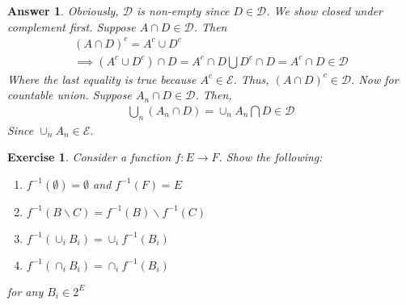 \documentclass[12pt]{article}
\theoremstyle{colon}
\newtheorem{exercise}{Exercise}
\newtheorem*{answer}{Answer}
\begin{document}
\begin{answer}
  Obviously, $\mathcal{D}$ is non-empty since $D \in \mathcal{D}$. We show closed under complement first. Suppose $A \cap D \in \mathcal{D}$. Then
  \begin{gather*}
    (A \cap D)^c = A^c \cup D^c \\
    \implies (A^c \cup D^c) \cap D = A^c \cap D \bigcup D^c \cap D = A^c \cap D \in \mathcal{D}
  \end{gather*}
  Where the last equality is true because $A^c \in \mathcal{E}$.
  Thus, $(A \cap D)^c \in \mathcal{D}$. Now for countable union. Suppose $A_n \cap D \in \mathcal{D}$. Then,
  \begin{gather*}
    \bigcup_n (A_n \cap D) = \cup_n A_n \bigcap D \in \mathcal{D}
  \end{gather*}
  Since $\cup_n A_n \in \mathcal{E}$.
\end{answer}

\clearpage

\begin{exercise}
  Consider a function $f: E \rightarrow F$. Show the following:
  \begin{enumerate}[label=\roman*)]
    \item $f^{-1}(\emptyset) = \emptyset$ and $f^{-1}(F) = E$
    \item $f^{-1}(B \backslash C) = f^{-1}(B) \backslash f^{-1}(C)$
    \item $f^{-1}(\cup_i B_i) = \cup_i f^{-1}(B_i)$
    \item $f^{-1}(\cap_i B_i) = \cap_i f^{-1}(B_i)$
  \end{enumerate}
  for any $B_i \in 2^E$
\end{exercise}
\end{document}
